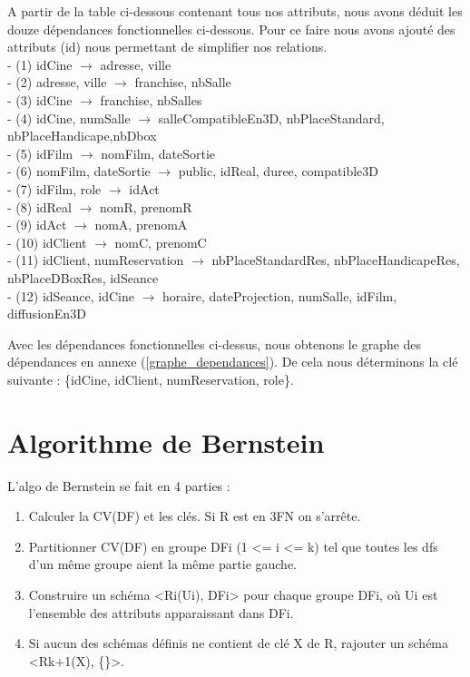\documentclass[a4paper,sffamily,12pt]{article}
\begin{document}
		\vspace{0.5cm}
	
		A partir de la table ci-dessous contenant tous nos attributs, nous avons déduit les douze dépendances fonctionnelles ci-dessous. Pour ce faire nous avons ajouté des attributs (id) nous permettant de simplifier nos relations.\\
	
		\noindent- (1) idCine $\rightarrow$ adresse, ville \\
		- (2) adresse, ville $\rightarrow$ franchise, nbSalle \\
		- (3) idCine $\rightarrow$ franchise, nbSalles \\
		- (4) idCine, numSalle $\rightarrow$ salleCompatibleEn3D, nbPlaceStandard, nbPlaceHandicape,nbDbox \\
 		- (5) idFilm $\rightarrow$ nomFilm, dateSortie \\
		- (6) nomFilm, dateSortie $\rightarrow$ public, idReal, duree, compatible3D \\
		- (7) idFilm, role $\rightarrow$  idAct \\
		- (8) idReal $\rightarrow$ nomR, prenomR \\
		- (9) idAct $\rightarrow$ nomA, prenomA \\
		- (10) idClient $\rightarrow$ nomC, prenomC \\
		- (11) idClient, numReservation $\rightarrow$ nbPlaceStandardRes, nbPlaceHandicapeRes, nbPlaceDBoxRes, idSeance \\
		- (12) idSeance, idCine $\rightarrow$ horaire, dateProjection, numSalle, idFilm, diffusionEn3D \\
		
		\newpage
		
		Avec les dépendances fonctionnelles ci-dessus, nous obtenons le graphe des dépendances en annexe (\ref{graphe_dependances}). De cela nous déterminons la clé suivante : \{idCine, idClient, numReservation, role\}.
		
	\section{Algorithme de Bernstein}
	
		\vspace{0.5cm}

		\noindent L'algo de Bernstein se fait en 4 parties :
	
			\begin{enumerate}[label=\ding{228}]
				\item Calculer la CV(DF) et les clés. Si R est en 3FN on s'arrête. 
				\item Partitionner CV(DF) en groupe DFi (1 <= i <= k) tel que toutes les dfs d'un même groupe aient la même partie gauche. 
				\item Construire un schéma <Ri(Ui), DFi> pour chaque groupe DFi, où Ui est l'ensemble des attributs apparaissant dans DFi.
				\item Si aucun des schémas définis ne contient de clé X de R, rajouter un schéma <Rk+1(X), \{\}>.
			\end{enumerate}	
			
\end{document}
